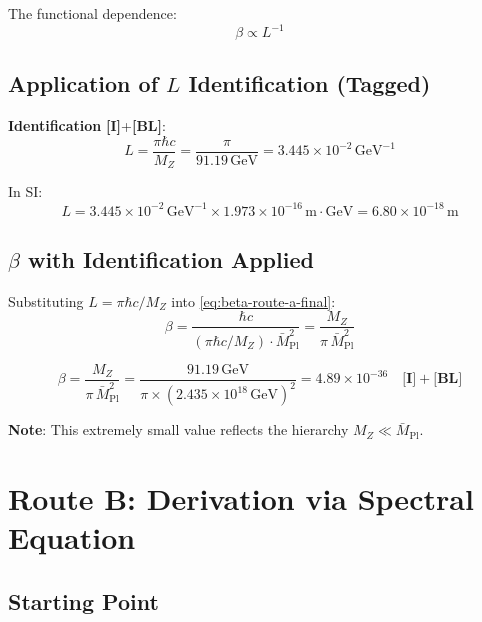 \documentclass[11pt,a4paper]{article}
\newcommand{\Mpl}{\bar{M}_{\mathrm{Pl}}}
\newcommand{\MZ}{M_Z}
\newcommand{\GeV}{\,\mathrm{GeV}}
\newcommand{\tagI}{\textbf{[I]}}
\newcommand{\tagBL}{\textbf{[BL]}}
\theoremstyle{definition}
\theoremstyle{plain}
\theoremstyle{remark}
\begin{document}
The functional dependence:
\begin{equation}
\beta \propto L^{-1}
\label{eq:beta-L-scaling}
\end{equation}

\subsection{Application of $L$ Identification (Tagged)}
\label{sec:L-identification}

\textbf{Identification} \tagI{}+\tagBL{}:
\begin{equation}
L = \frac{\pi \hbar c}{\MZ} = \frac{\pi}{91.19\GeV} = 3.445 \times 10^{-2}\GeV^{-1}
\label{eq:L-from-MZ}
\end{equation}

In SI:
\begin{equation}
L = 3.445 \times 10^{-2}\GeV^{-1} \times 1.973 \times 10^{-16}\,\text{m}\cdot\text{GeV}
= 6.80 \times 10^{-18}\,\text{m}
\label{eq:L-SI-meters}
\end{equation}

\subsection{$\beta$ with Identification Applied}

Substituting $L = \pi\hbar c/\MZ$ into \cref{eq:beta-route-a-final}:
\begin{equation}
\beta = \frac{\hbar c}{(\pi\hbar c/\MZ) \cdot \Mpl^2} = \frac{\MZ}{\pi \, \Mpl^2}
\label{eq:beta-with-MZ}
\end{equation}

\begin{equation}
\boxed{\beta = \frac{\MZ}{\pi \, \Mpl^2} = \frac{91.19\GeV}{\pi \times (2.435 \times 10^{18}\GeV)^2}
= 4.89 \times 10^{-36} \quad \tagI{}+\tagBL{}}
\label{eq:beta-numeric-final}
\end{equation}

\textbf{Note}: This extremely small value reflects the hierarchy $\MZ \ll \Mpl$.

\section{Route B: Derivation via Spectral Equation}
\label{sec:route-b}

\subsection{Starting Point}
\end{document}
